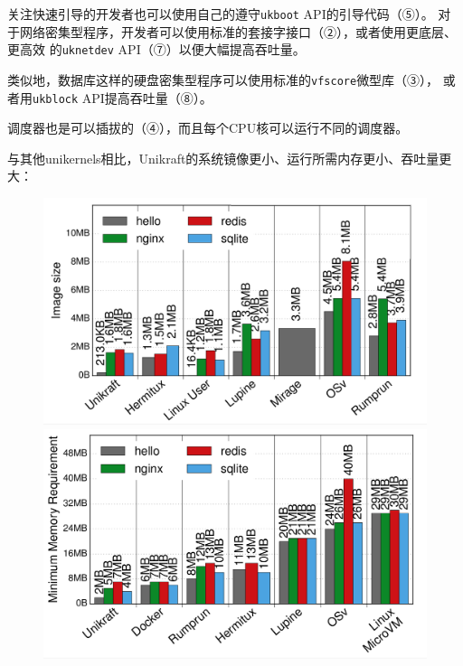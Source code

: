 \documentclass{../runikraft-report}
\begin{document}
关注快速引导的开发者也可以使用自己的遵守\texttt{ukboot} API的引导代码（⑤）。
对于网络密集型程序，开发者可以使用标准的套接字接口（②），或者使用更底层、更高效
的\texttt{uknetdev} API（⑦）以便大幅提高吞吐量。

类似地，数据库这样的硬盘密集型程序可以使用标准的\texttt{vfscore}微型库（③），
或者用\texttt{ukblock} API提高吞吐量（⑧）。

调度器也是可以插拔的（④），而且每个CPU核可以运行不同的调度器。


与其他unikernels相比，Unikraft的系统镜像更小、运行所需内存更小、吞吐量更大：
\begin{figure}[H]
\centering
\begin{minipage}{0.32\linewidth}
\includegraphics[width=1\linewidth]{pictures/Unikraft-image-size.png}
\caption{}
\label{fig:unikraft-image-size}
\end{minipage}
\begin{minipage}{0.32\linewidth}
\includegraphics[width=1\linewidth]{pictures/Unikraft-memory.png}
\caption{}
\end{minipage}

\end{figure}
\end{document}
